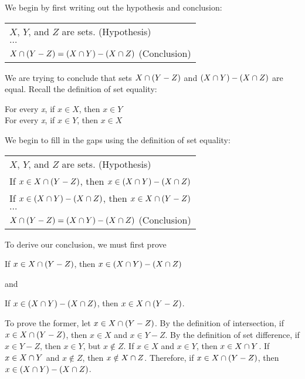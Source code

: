 We begin by first writing out the hypothesis and conclusion:

\begin{table}[h]
\centering
\begin{tabular}{l}
$X$, $Y$, and $Z$ are sets. (Hypothesis)\\
$\dots$\\
$X \cap (Y - Z) = (X \cap Y) - (X \cap Z)$ (Conclusion)
\end{tabular}
\end{table}

We are trying to conclude that sets $X \cap (Y - Z)$ and $(X \cap Y) - (X \cap Z)$ are equal.  Recall the definition of set equality:
\begin{center}
    For every \textit{x}, if $x \in X$, then $x \in Y$\\
    For every \textit{x}, if $x \in Y$, then $x \in X$
\end{center}

We begin to fill in the gaps using the definition of set equality:

\begin{table}[h]
\centering
\begin{tabular}{l}
$X$, $Y$, and $Z$ are sets. (Hypothesis)\\
If $x \in X \cap (Y - Z)$, then $x \in (X \cap Y) - (X \cap Z)$\\
If $x \in (X \cap Y) - (X \cap Z)$, then $x \in X \cap (Y - Z)$\\
$\dots$\\
$X \cap (Y - Z) = (X \cap Y) - (X \cap Z)$ (Conclusion)
\end{tabular}
\end{table}

To derive our conclusion, we must first prove
\begin{center}
    If $x \in X \cap (Y - Z)$, then $x \in (X \cap Y) - (X \cap Z)$
\end{center}

and 
\begin{center}
    If $x \in (X \cap Y) - (X \cap Z)$, then $x \in X \cap (Y - Z)$.
\end{center}

To prove the former, let $x \in X \cap (Y - Z)$.  By the definition of intersection, if $x \in X \cap (Y - Z)$, then $x \in X$ and $x \in Y - Z$.  By the definition of set difference, if $x \in Y - Z$, then $x \in Y$, but $x \notin Z$.  If $x \in X$ and $x \in Y$, then $x \in X \cap Y$.  If $x \in X \cap Y$ and $x \notin Z$, then $x \notin X \cap Z$.  Therefore, if $x \in X \cap (Y - Z)$, then $x \in (X \cap Y) - (X \cap Z)$.\\

